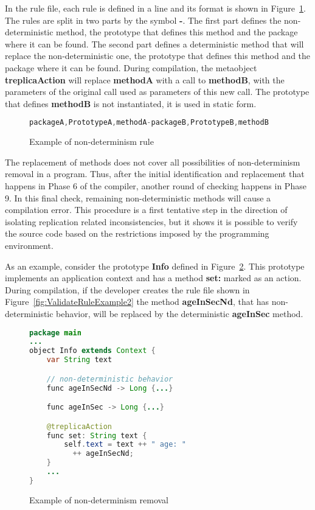 \documentclass[preprint,review]{elsarticle}
\newcommand{\srcstyle}[1]{\ttfamily\textbf{#1}\rmfamily}
\begin{document}
In the  rule file, each rule  is defined in  a line and its  format is
shown in Figure~\ref{fig:ValidateRuleExample}.  The rules are split in
two  parts by  the symbol  \srcstyle{-}.  The  first part  defines the
non-deterministic method,  the prototype that defines  this method and
the  package  where it  can  be  found.   The  second part  defines  a
deterministic method that will  replace the non-deterministic one, the
prototype that  defines this method  and the  package where it  can be
found.  During  compilation, the  metaobject \srcstyle{treplicaAction}
will  replace \srcstyle{methodA}  with a  call to  \srcstyle{methodB},
with the  parameters of the original  call used as parameters  of this
new  call.   The  prototype  that defines  \srcstyle{methodB}  is  not
instantiated, it is used in static form.

\begin{figure}[h]
\centering
\begin{lstlisting}[language=Java]
packageA,PrototypeA,methodA-packageB,PrototypeB,methodB
\end{lstlisting}
\caption{Example of non-determinism rule}
\label{fig:ValidateRuleExample}
\end{figure}

The  replacement  of  methods  does not  cover  all  possibilities  of
non-determinism  removal  in  a   program.  Thus,  after  the  initial
identification  and  replacement  that  happens  in  Phase  6  of  the
compiler, another round of checking happens  in Phase 9. In this final
check, remaining  non-deterministic methods  will cause  a compilation
error. This  procedure is a first  tentative step in the  direction of
isolating  replication related  inconsistencies,  but it  shows it  is
possible to verify  the source code based on  the restrictions imposed
by the programming environment.

As  an  example, consider  the  prototype  \srcstyle{Info} defined  in
Figure~\ref{fig:ValidateExample}.    This   prototype  implements   an
application  context and  has a  method \srcstyle{set:}  marked as  an
action. During  compilation, if  the developer  creates the  rule file
shown    in     Figure~\ref{fig:ValidateRuleExample2}    the    method
\srcstyle{ageInSecNd},  that has  non-deterministic behavior,  will be
replaced by the deterministic \srcstyle{ageInSec} method.

\begin{figure}[htbp]
\centering
\begin{lstlisting}[language=Java]
package main
...
object Info extends Context {
    var String text

    // non-deterministic behavior
    func ageInSecNd -> Long {...}

    func ageInSec -> Long {...}

    @treplicaAction
    func set: String text {
        self.text = text ++ " age: "
          ++ ageInSecNd;
    }
    ...
}
\end{lstlisting}
\caption{Example of non-determinism removal}
\label{fig:ValidateExample}
\end{figure}
\end{document}
